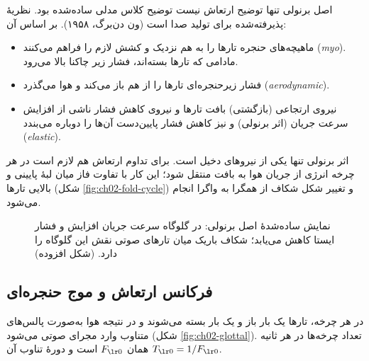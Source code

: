 \begin{correctionbox}{اصل برنولی تنها توضیح ارتعاش نیست}
توضیح کلاس مدلی ساده‌شده بود. نظریهٔ پذیرفته‌شده برای تولید صدا  است (ون دن‌برگ، ۱۹۵۸). بر اساس آن:
\begin{itemize}
  \item ماهیچه‌های حنجره تارها را به هم نزدیک و کشش لازم را فراهم می‌کنند (\emph{myo}). مادامی که تارها بسته‌اند، فشار زیر چاکنا بالا می‌رود.
  \item فشار زیرحنجره‌ای تارها را از هم باز می‌کند و هوا می‌گذرد (\emph{aerodynamic}).
  \item نیروی ارتجاعی (بازگشتی) بافت تارها و نیروی کاهش فشار ناشی از افزایش سرعت جریان (اثر برنولی) و نیز کاهش فشار پایین‌دست آن‌ها را دوباره می‌بندد (\emph{elastic}).
\end{itemize}
اثر برنولی تنها یکی از نیروهای دخیل است. برای تداوم ارتعاش هم لازم است در هر چرخه انرژی از جریان هوا به بافت منتقل شود؛ این کار با تفاوت فاز میان لبهٔ پایینی و بالایی تارها (شکل \ref{fig:ch02-fold-cycle}) و تغییر شکل شکاف از همگرا به واگرا انجام می‌شود.
\end{correctionbox}

\begin{figure}[htbp]
\centering
{}
\caption{نمایش ساده‌شدهٔ اصل برنولی: در گلوگاه سرعت جریان افزایش و فشار ایستا کاهش می‌یابد؛ شکاف باریک میان تارهای صوتی نقش این گلوگاه را دارد. (شکل افزوده)}
\end{figure}

\subsection{فرکانس ارتعاش و موج حنجره‌ای}
در هر چرخه، تارها یک بار باز و یک بار بسته می‌شوند و در نتیجه هوا به‌صورت پالس‌های متناوب وارد مجرای صوتی می‌شود (شکل \ref{fig:ch02-glottal}). تعداد چرخه‌ها در هر ثانیه همان $\chtwoFz $ است و دورهٔ تناوب آن $\chtwoTz  = 1/\chtwoFz $.


